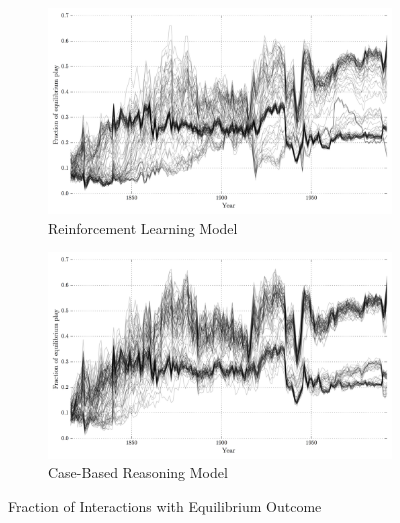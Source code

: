 \begin{figure}[h!]
    \centering

    \begin{subfigure}[t]{\textwidth}
        \includegraphics[width=\textwidth]{WarReason/Figures/RL_equilibria}
        \caption{Reinforcement Learning Model}
    \end{subfigure}
    
    \begin{subfigure}[t]{\textwidth}
        \includegraphics[width=\textwidth]{WarReason/Figures/CB_equilibria}
        \caption{Case-Based Reasoning Model}
    \end{subfigure}

    \caption{Fraction of Interactions with Equilibrium Outcome}
    \label{fig:ex2_traces}
    \figSpace
\end{figure}

